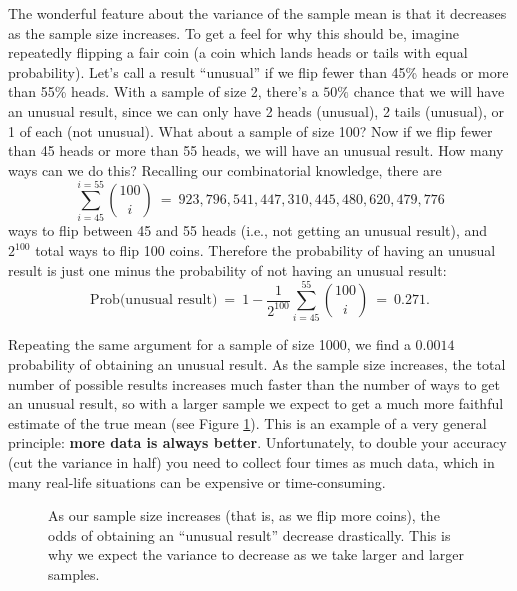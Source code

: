 The wonderful feature about the variance of the sample mean is that it decreases as the sample size increases. To get a feel for why this should be, imagine repeatedly flipping a fair coin (a coin which lands heads or tails with equal probability). Let's call a result ``unusual'' if we flip fewer than 45\% heads or more than 55\% heads.  With a sample of size 2, there's a $50\%$ chance that we will have an unusual result, since we can only have 2 heads (unusual), 2 tails (unusual), or 1 of each (not unusual). What about a sample of size 100? Now if we flip fewer than 45 heads or more than  55 heads, we will have an unusual result. How many ways can we do this? Recalling our combinatorial knowledge, there are \begin{equation*}
\sum_{i=45}^{i=55}{100 \choose i} \ = \ 923,796,541,447,310,445,480,620,479,776
\end{equation*}
ways to flip between 45 and 55 heads (i.e., not getting an unusual result), and $2^{100}$ total ways to flip 100 coins. Therefore the probability of having an unusual result is just one minus the probability of not having an unusual result:
\begin{equation*}
\textrm{Prob(unusual result)} \ = \  1-\frac{1}{2^{100}}\sum_{i=45}^{55}{100 \choose i}\ = \ 0.271.
\end{equation*}

Repeating the same argument for a sample of size 1000, we find a $0.0014$ probability of obtaining an unusual result.  As the sample size increases, the total number of possible results increases much faster than the number of ways to get an unusual result, so with a larger sample we expect to get a much more faithful estimate of the true mean (see Figure \ref{fig:unusualresults}).  This is an example of a very general principle: \textbf{more data is always better}. Unfortunately, to double your accuracy (cut the variance in half) you need to collect four times as much data, which in many real-life situations can be expensive or time-consuming.

\begin{figure}[h!]
\begin{center}
\caption{\label{fig:unusualresults} As our sample size increases (that is, as we flip more coins), the odds of obtaining an ``unusual result'' decrease drastically.  This is why we expect the variance to decrease as we take larger and larger samples.}
\end{center}
\end{figure}

